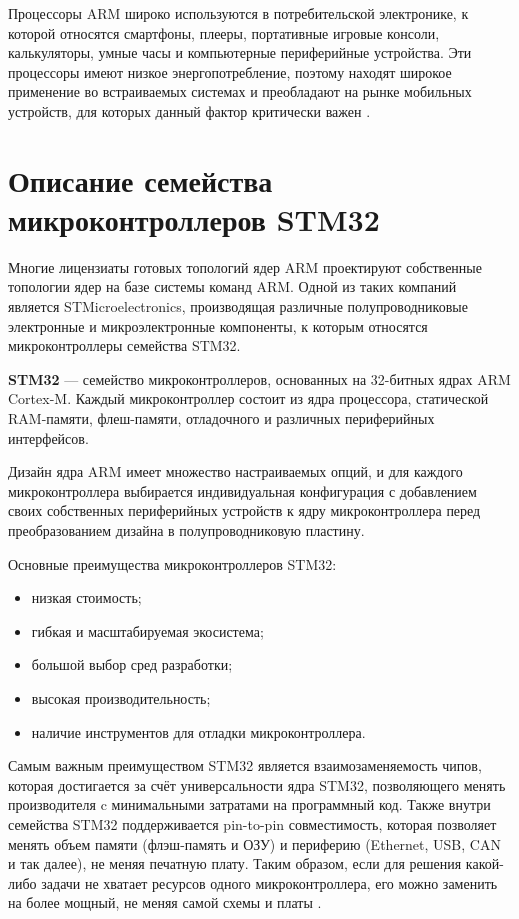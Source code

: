 Процессоры ARM широко используются в потребительской электронике, к которой относятся смартфоны, плееры, портативные игровые консоли, калькуляторы, умные часы и компьютерные периферийные устройства. Эти процессоры имеют низкое энергопотребление, поэтому находят широкое применение во встраиваемых системах и преобладают на рынке мобильных устройств, для которых данный фактор критически важен \cite{ARM_consumers}.

\section{Описание семейства микроконтроллеров STM32}
Многие лицензиаты готовых топологий ядер ARM проектируют собственные топологии ядер на базе системы команд ARM. Одной из таких компаний является STMicroelectronics, производящая различные полупроводниковые электронные и микроэлектронные компоненты, к которым относятся микроконтроллеры семейства STM32.

\textbf{STM32} — семейство микроконтроллеров, основанных на 32-битных ядрах ARM Cortex-M. Каждый микроконтроллер состоит из ядра процессора, статической RAM-памяти, флеш-памяти, отладочного и различных периферийных интерфейсов.

Дизайн ядра ARM имеет множество настраиваемых опций, и для каждого микроконтроллера выбирается индивидуальная конфигурация с добавлением своих собственных периферийных устройств к ядру микроконтроллера перед преобразованием дизайна в полупроводниковую пластину.

Основные преимущества микроконтроллеров STM32:
\begin{itemize}
	\item низкая стоимость;
	\item гибкая и масштабируемая экосистема;
	\item большой выбор сред разработки;
	\item высокая производительность;
	\item наличие инструментов для отладки микроконтроллера.
\end{itemize}

Самым важным преимуществом STM32 является взаимозаменяемость чипов, которая достигается за счёт универсальности ядра STM32, позволяющего менять производителя c минимальными затратами на программный код. Также внутри семейства STM32 поддерживается pin-to-pin совместимость, которая позволяет менять объем памяти (флэш-память и ОЗУ) и периферию (Ethernet, USB, CAN и так далее), не меняя печатную плату. Таким образом, если для решения какой-либо задачи не хватает ресурсов одного микроконтроллера, его можно заменить на более мощный, не меняя самой схемы и платы \cite{STM32_advantages}.

